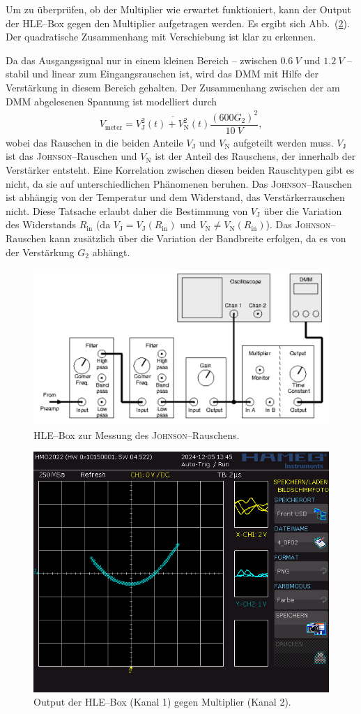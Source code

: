 \documentclass[sn-mathphys-num,iicol]{sn-jnl}
\theoremstyle{thmstyleone}
\theoremstyle{thmstyletwo}
\theoremstyle{thmstylethree}
\begin{document}
Um zu überprüfen, ob der Multiplier wie erwartet funktioniert, kann der Output der HLE--Box gegen den Multiplier aufgetragen werden.
Es ergibt sich Abb.\ (\ref{fig:multiplier}).
Der quadratische Zusammenhang mit Verschiebung ist klar zu erkennen. %

Da das Ausgangssignal nur in einem kleinen Bereich -- zwischen $\SI{0.6}{V}$ und $\SI{1.2}{V}$ -- stabil und linear zum Eingangsrauschen ist, wird das DMM mit Hilfe der Verstärkung in diesem Bereich gehalten.
Der Zusammenhang zwischen der am DMM abgelesenen Spannung ist modelliert durch
\begin{align}
	V_\text{meter}=\overline{V_\text{J}^2(t)+V_\text{N}^2(t)}\dfrac{\left(600G_2\right)^2}{\SI{10}{V}}
	,\end{align}
wobei das Rauschen in die beiden Anteile $V_\text{J}$ und $V_\text{N}$ aufgeteilt werden muss.
$V_\text{J}$ ist das \textsc{Johnson}--Rauschen und $V_\text{N}$ ist der Anteil des Rauschens, der innerhalb der Verstärker entsteht.
Eine Korrelation zwischen diesen beiden Rauschtypen gibt es nicht, da sie auf unterschiedlichen Phänomenen beruhen.
Das \textsc{Johnson}--Rauschen ist abhängig von der Temperatur und dem Widerstand, das Verstärkerrauschen nicht.
Diese Tatsache erlaubt daher die Bestimmung von $V_\text{J}$ über die Variation des Widerstands $R_\text{in}$ (da $V_\text{J}=V_\text{J}(R_\text{in})$ und $V_\text{N}\neq V_\text{N}(R_\text{in})$).
Das \textsc{Johnson}--Rauschen kann zusätzlich über die Variation der Bandbreite erfolgen, da es von der Verstärkung $G_2$ abhängt.

\begin{figure}[t]
	\centering
	\includegraphics[width=.5\textwidth]{425_schaltplan_messung_johnson.png}
	\caption{HLE--Box zur Messung des \textsc{Johnson}--Rauschens.\cite{anleitung425}} \label{fig:johnson_hle_messung}
\end{figure}

\begin{figure}[t]
	\centering
	\includegraphics[width=.5\textwidth]{../data/4_0F02.png}
	\caption{Output der HLE--Box (Kanal 1) gegen Multiplier (Kanal 2).} \label{fig:multiplier}
\end{figure}
\end{document}
